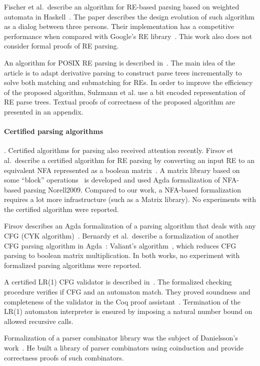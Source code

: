\documentclass[review]{elsarticle}
\begin{document}
Fischer et al.~describe an algorithm for RE-based parsing based on
weighted automata in Haskell~\cite{Fischer2010}.  The paper describes
the design evolution of such algorithm as a dialog between three
persons. Their implementation has a competitive performance when
compared with Google's RE library~\cite{re2}. This work also does not
consider formal proofs of RE parsing.

An algorithm for POSIX RE parsing is described
in~\cite{SulzmannL14}. The main idea of the article is to adapt
derivative parsing to construct parse trees incrementally to solve
both matching and submatching for REs. In order to improve the
efficiency of the proposed algorithm, Sulzmann et al. use a bit
encoded representation of RE parse trees. Textual proofs of
correctness of the proposed algorithm are presented in an appendix.

\paragraph{Certified parsing algorithms}. Certified algorithms for
parsing also received attention recently. Firsov et al.~describe a
certified algorithm for RE parsing by converting an input RE to an
equivalent NFA represented as a boolean matrix~\cite{FirsovU13}. A
matrix library based on some ``block'' operations~\cite{MacedoO13} is
developed and used Agda formalization of NFA-based parsing
{Norell2009}. Compared to our work, a NFA-based formalization requires
a lot more infrastructure (such as a Matrix library). No experiments
with the certified algorithm were reported.

Firsov describes an Agda formalization of a parsing algorithm that
deals with any CFG (CYK algorithm)~\cite{Firsov2014}. Bernardy
et al.~describe a formalization of another CFG parsing algorithm in
Agda~\cite{BernardyJ16}: Valiant's algorithm~\cite{Valiant1975}, which
reduces CFG parsing to boolean matrix multiplication. In both works,
no experiment with formalized parsing algorithms were reported.

A certified LR(1) CFG validator is described
in~\cite{Jourdan2012}. The formalized checking procedure verifies if
CFG and an automaton match. They proved soundness and completeness of
the validator in the Coq proof
assistant~\cite{Bertot2010}. Termination of the LR(1) automaton
interpreter is ensured by imposing a natural number bound on
allowed recursive calls.

Formalization of a parser combinator library was the subject of
Danielsson's work~\cite{Danielsson2010}. He built a library of parser
combinators using coinduction and provide correctness proofs of such
combinators.
\end{document}
